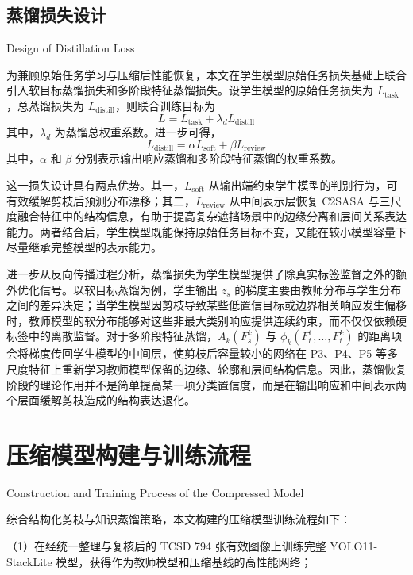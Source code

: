 \subsection{蒸馏损失设计}{Design of Distillation Loss}

为兼顾原始任务学习与压缩后性能恢复，本文在学生模型原始任务损失基础上联合引入软目标蒸馏损失和多阶段特征蒸馏损失。设学生模型的原始任务损失为 $L_{\mathrm{task}}$，总蒸馏损失为 $L_{\mathrm{distill}}$，则联合训练目标为
\begin{equation}
L = L_{\mathrm{task}} + \lambda_d L_{\mathrm{distill}}
\end{equation}
其中，$\lambda_d$ 为蒸馏总权重系数。进一步可得，
\begin{equation}
L_{\mathrm{distill}} = \alpha L_{\mathrm{soft}} + \beta L_{\mathrm{review}}
\end{equation}
其中，$\alpha$ 和 $\beta$ 分别表示输出响应蒸馏和多阶段特征蒸馏的权重系数。

这一损失设计具有两点优势。其一，$L_{\mathrm{soft}}$ 从输出端约束学生模型的判别行为，可有效缓解剪枝后预测分布漂移；其二，$L_{\mathrm{review}}$ 从中间表示层恢复 C2SASA 与三尺度融合特征中的结构信息，有助于提高复杂遮挡场景中的边缘分离和层间关系表达能力。两者结合后，学生模型既能保持原始任务目标不变，又能在较小模型容量下尽量继承完整模型的表示能力。

进一步从反向传播过程分析，蒸馏损失为学生模型提供了除真实标签监督之外的额外优化信号。以软目标蒸馏为例，学生输出 $z_s$ 的梯度主要由教师分布与学生分布之间的差异决定；当学生模型因剪枝导致某些低置信目标或边界相关响应发生偏移时，教师模型的软分布能够对这些非最大类别响应提供连续约束，而不仅仅依赖硬标签中的离散监督。对于多阶段特征蒸馏，$A_k(F_s^k)$ 与 $\phi_k(F_t^1,\ldots,F_t^k)$ 的距离项会将梯度传回学生模型的中间层，使剪枝后容量较小的网络在 P3、P4、P5 等多尺度特征上重新学习教师模型保留的边缘、轮廓和层间结构信息。因此，蒸馏恢复阶段的理论作用并不是简单提高某一项分类置信度，而是在输出响应和中间表示两个层面缓解剪枝造成的结构表达退化。

\section{压缩模型构建与训练流程}{Construction and Training Process of the Compressed Model}

综合结构化剪枝与知识蒸馏策略，本文构建的压缩模型训练流程如下：

\par\noindent
（1）在经统一整理与复核后的 TCSD 794 张有效图像上训练完整 YOLO11-StackLite 模型，获得作为教师模型和压缩基线的高性能网络；

